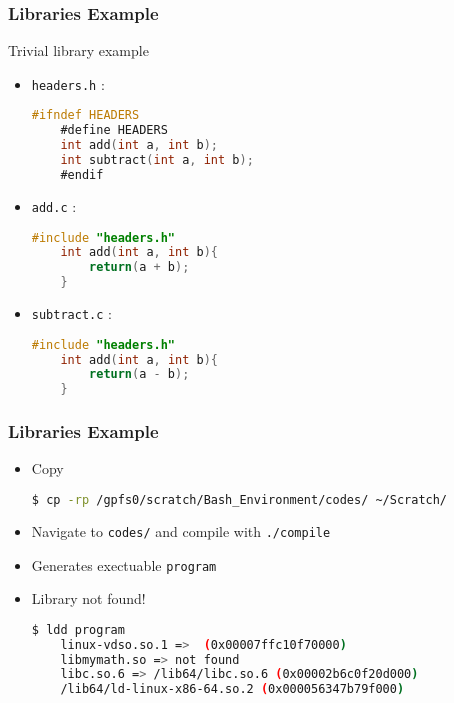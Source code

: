\documentclass{beamer}
\newcommand{\code}[1]{\colorbox{codegray}{\texttt{#1}}}
\begin{document}
\begin{frame}[fragile]
\frametitle{Libraries Example}
Trivial library example 
\begin{itemize}
    \item \code{headers.h} : 
    \begingroup
    \scriptsize
    \begin{lstlisting}[backgroundcolor = \color{codegray}, language = C, showstringspaces=false]
    #ifndef HEADERS
    #define HEADERS
    int add(int a, int b);
    int subtract(int a, int b);
    #endif
    \end{lstlisting}
    \endgroup
    
    \item \code{add.c} : 
    \begingroup
    \scriptsize
    \begin{lstlisting}[backgroundcolor = \color{codegray}, language = C, showstringspaces=false]
    #include "headers.h"
    int add(int a, int b){
        return(a + b);
    }
    \end{lstlisting}
    \endgroup
    
    
    \item \code{subtract.c} : 
    \begingroup
    \scriptsize
    \begin{lstlisting}[backgroundcolor = \color{codegray}, language = C, showstringspaces=false]
    #include "headers.h"
    int add(int a, int b){
        return(a - b);
    }
    \end{lstlisting}
    \endgroup
\end{itemize}
\end{frame}


\begin{frame}[fragile]
\frametitle{Libraries Example}
\begin{itemize}
    \item Copy 
    \begingroup
    \scriptsize
    \begin{lstlisting}[backgroundcolor = \color{codegray}, language = Bash, showstringspaces=false]
    $ cp -rp /gpfs0/scratch/Bash_Environment/codes/ ~/Scratch/
    \end{lstlisting}
    \endgroup
    \pause

    \item Navigate to \code{codes/} and compile with \code{./compile} 
    \pause

    \item Generates exectuable \code{program}
    \pause

    \item Library not found!
    \begingroup
    \scriptsize
    \begin{lstlisting}[backgroundcolor = \color{codegray}, language = Bash, showstringspaces=false]
    $ ldd program
	linux-vdso.so.1 =>  (0x00007ffc10f70000)
	libmymath.so => not found
	libc.so.6 => /lib64/libc.so.6 (0x00002b6c0f20d000)
	/lib64/ld-linux-x86-64.so.2 (0x000056347b79f000)
    \end{lstlisting}
    \endgroup
\end{itemize}
\end{frame}
\end{document}
